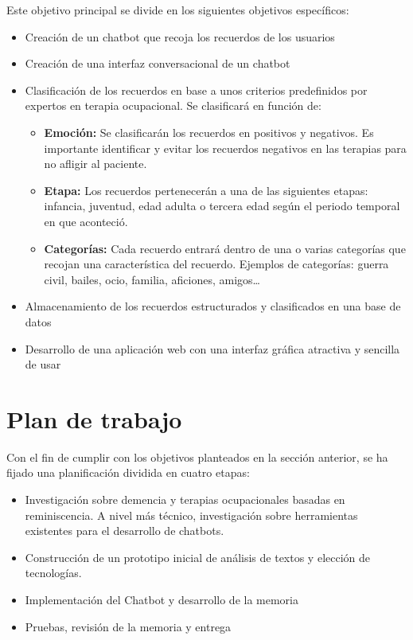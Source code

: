 Este objetivo principal se divide en los siguientes objetivos específicos:
\begin{itemize}
	\item Creación de un chatbot que recoja los recuerdos de los usuarios
	\item Creación de una interfaz conversacional de un chatbot
	\item Clasificación de los recuerdos en base a unos criterios predefinidos por expertos en terapia ocupacional. Se clasificará en función de: 
	\begin{itemize}
		\item \textbf{Emoción:} Se clasificarán los recuerdos en positivos y negativos. Es importante identificar y evitar los recuerdos negativos en las terapias para no afligir al paciente. 
		\item \textbf{Etapa:} Los recuerdos pertenecerán a una de las siguientes etapas: infancia, juventud, edad adulta o tercera edad según el periodo temporal en que aconteció.
		\item \textbf{Categorías:} Cada recuerdo entrará dentro de una o varias categorías que recojan una característica del recuerdo. Ejemplos de categorías: guerra civil, bailes, ocio, familia, aficiones, amigos…
	\end{itemize}
	\item Almacenamiento de los recuerdos estructurados y clasificados en una base de datos 
	\item Desarrollo de una aplicación web con una interfaz gráfica atractiva y sencilla de usar
\end{itemize}


\section{Plan de trabajo}

Con el fin de cumplir con los objetivos planteados en la sección anterior, se ha fijado una planificación dividida en cuatro etapas:
\begin{itemize}
	\item Investigación sobre demencia y terapias ocupacionales basadas en reminiscencia. A nivel más técnico, investigación sobre herramientas existentes para el desarrollo de chatbots.
	\item Construcción de un prototipo inicial de análisis de textos y elección de tecnologías.
	\item Implementación del Chatbot y desarrollo de la memoria
	\item Pruebas, revisión de la memoria y entrega
\end{itemize}

